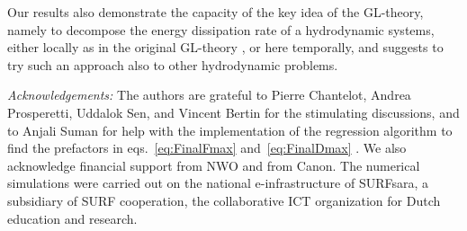 \documentclass[preprint,amssymb,superscriptaddress,aps,prl,floatfix]{revtex4-1}
\begin{document}
Our results also demonstrate the capacity of the key idea of 
the GL-theory, namely to decompose the energy dissipation rate 
of a hydrodynamic systems, either locally as in the original GL-theory
\cite{grossmann2000scaling,grossmann2001thermal},
or here temporally, and suggests to try such an approach also to
other hydrodynamic problems. 


\begin{acknowledgments}
{\it Acknowledgements:} The authors are grateful to Pierre Chantelot, Andrea Prosperetti, Uddalok Sen, and Vincent Bertin for the stimulating discussions, and 
to Anjali Suman for help with the implementation of the regression algorithm to find the prefactors in eqs.~\eqref{eq:FinalFmax} and~\eqref{eq:FinalDmax} \cite{supplMaterial}.
We also acknowledge financial support from NWO and from Canon. 
The numerical simulations were carried out on the national e-infrastructure of SURFsara, a subsidiary of SURF cooperation, the collaborative ICT organization for Dutch education and research. 
\end{acknowledgments}

\vspace{-5mm}



\end{document}
